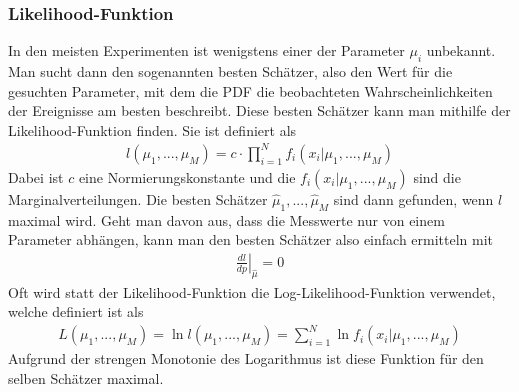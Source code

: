\subsubsection{Likelihood-Funktion}
In den meisten Experimenten ist wenigstens einer der Parameter $\mu_{i}$ unbekannt.
Man sucht dann den sogenannten \glqq besten Schätzer\grqq{}, also den Wert für die gesuchten Parameter, mit dem die PDF die beobachteten Wahrscheinlichkeiten der Ereignisse am besten beschreibt.
Diese besten Schätzer kann man mithilfe der Likelihood-Funktion finden.
Sie ist definiert als
\begin{gather}
l(\mu_{1},...,\mu_{M}) = c \cdot \prod_{i=1}^{N} f_{i}(x_{i}|\mu_{1},...,\mu_{M})
\end{gather}
Dabei ist $c$ eine Normierungskonstante und die $f_{i}(x_{i}|\mu_{1},...,\mu_{M})$ sind die Marginalverteilungen.
Die besten Schätzer $\hat{\mu}_{1},...,\hat{\mu}_{M}$ sind dann gefunden, wenn $l$ maximal wird.
Geht man davon aus, dass die Messwerte nur von einem Parameter abhängen, kann man den besten Schätzer also einfach ermitteln mit
\begin{gather}
\left. \frac{dl}{dp} \right |_{\hat{\mu}} = 0
\end{gather}
Oft wird statt der Likelihood-Funktion die Log-Likelihood-Funktion verwendet, welche definiert ist als
\begin{gather}
L(\mu_{1},...,\mu_{M}) = \ln{l(\mu_{1},...,\mu_{M})} = \sum_{i=1}^{N} \ln{f_{i}(x_{i}|\mu_{1},...,\mu_{M})}
\end{gather}
Aufgrund der strengen Monotonie des Logarithmus ist diese Funktion für den selben Schätzer maximal.

